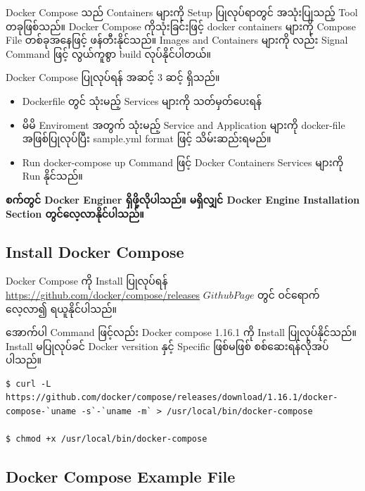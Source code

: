 Docker Compose သည် Containers များကို Setup ပြုလုပ်ရာတွင် အသုံးပြုသည့်
Tool တခုဖြစ်သည်။ Docker Compose ကိုသုံးခြင်းဖြင့် docker containers
များကို Compose File တစ်ခုအနေဖြင့် ဖန်တီးနိုင်သည်။ Images and Containers
များကို လည်း Signal Command ဖြင့် လွယ်ကူစွာ build လုပ်နိုင်ပါတယ်။

Docker Compose ပြုလုပ်ရန် အဆင့် $3$ ဆင့် ရှိသည်။

\begin{itemize}
\itemsep1pt\parskip0pt
\item
  Dockerfile တွင် သုံးမည့် Services များကို သတ်မှတ်ပေးရန်\\
\item
  မိမိ Enviroment အတွက် သုံးမည့် Service and Application များကို
  docker-file အဖြစ်ပြုလုပ်ပြီး sample.yml format ဖြင့် သိမ်းဆည်းရမည်။\\
\item
  Run docker-compose up Command ဖြင့် Docker Containers Services များကို
  Run နိုင်သည်။
\end{itemize}

\textbf{စက်တွင် Docker Enginer ရှိဖို့လိုပါသည်။ မရှိလျှင် Docker Engine
Installation Section တွင်လေ့လာနိုင်ပါသည်။}

\subsection{Install Docker Compose}\label{install-docker-compose}

Docker Compose ကို Install ပြုလုပ်ရန်
\href{https://github.com/docker/compose/releases}{\url{https://github.com/docker/compose/releases}}
$Github Page$ တွင် ဝင်ရောက်လေ့လာ၍ ရယူနိုင်ပါသည်။

အောက်ပါ Command ဖြင့်လည်း Docker compose 1.16.1 ကို Install
ပြုလုပ်နိုင်သည်။ Install မပြုလုပ်ခင် Docker versition နှင့် Specific
ဖြစ်မဖြစ် စစ်ဆေးရန်လိုအပ်ပါသည်။

\begin{verbatim}
$ curl -L https://github.com/docker/compose/releases/download/1.16.1/docker-compose-`uname -s`-`uname -m` > /usr/local/bin/docker-compose

$ chmod +x /usr/local/bin/docker-compose
\end{verbatim}

\subsection{Docker Compose Example
File}\label{docker-compose-example-file}

